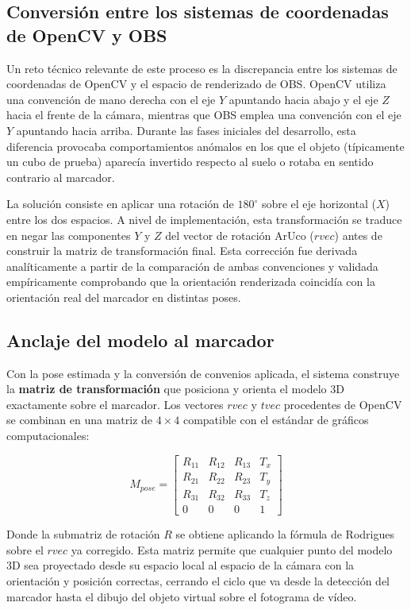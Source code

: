 \subsection{Conversión entre los sistemas de coordenadas de OpenCV y OBS}
\label{subsec:conversion_coordenadas}

Un reto técnico relevante de este proceso es la discrepancia entre los sistemas de coordenadas de OpenCV y el espacio de renderizado de OBS. OpenCV utiliza una convención de mano derecha con el eje $Y$ apuntando hacia abajo y el eje $Z$ hacia el frente de la cámara, mientras que OBS emplea una convención con el eje $Y$ apuntando hacia arriba. Durante las fases iniciales del desarrollo, esta diferencia provocaba comportamientos anómalos en los que el objeto (típicamente un cubo de prueba) aparecía invertido respecto al suelo o rotaba en sentido contrario al marcador.

La solución consiste en aplicar una rotación de $180^\circ$ sobre el eje horizontal ($X$) entre los dos espacios. A nivel de implementación, esta transformación se traduce en negar las componentes $Y$ y $Z$ del vector de rotación ArUco ($rvec$) antes de construir la matriz de transformación final. Esta corrección fue derivada analíticamente a partir de la comparación de ambas convenciones y validada empíricamente comprobando que la orientación renderizada coincidía con la orientación real del marcador en distintas poses.

\subsection{Anclaje del modelo al marcador}
\label{subsec:anclaje_modelo}

Con la pose estimada y la conversión de convenios aplicada, el sistema construye la \textbf{matriz de transformación} que posiciona y orienta el modelo 3D exactamente sobre el marcador. Los vectores $rvec$ y $tvec$ procedentes de OpenCV se combinan en una matriz de $4\times4$ compatible con el estándar de gráficos computacionales:

\[ M_{pose} = \begin{bmatrix}
R_{11} & R_{12} & R_{13} & T_x \\
R_{21} & R_{22} & R_{23} & T_y \\
R_{31} & R_{32} & R_{33} & T_z \\
0 & 0 & 0 & 1
\end{bmatrix} \]

Donde la submatriz de rotación $R$ se obtiene aplicando la fórmula de Rodrigues sobre el $rvec$ ya corregido. Esta matriz permite que cualquier punto del modelo 3D sea proyectado desde su espacio local al espacio de la cámara con la orientación y posición correctas, cerrando el ciclo que va desde la detección del marcador hasta el dibujo del objeto virtual sobre el fotograma de vídeo.

